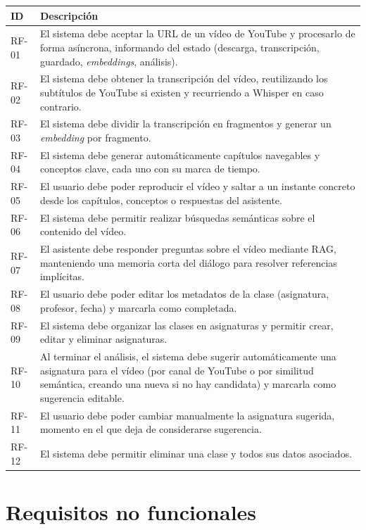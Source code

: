 \begin{longtable}{p{2cm}p{11.5cm}}
  \toprule
  \textbf{ID} & \textbf{Descripción} \\
  \midrule
  \endhead
  RF-01 & El sistema debe aceptar la URL de un vídeo de YouTube y procesarlo de forma asíncrona,
          informando del estado (descarga, transcripción, guardado, \textit{embeddings}, análisis). \\
  RF-02 & El sistema debe obtener la transcripción del vídeo, reutilizando los subtítulos de
          YouTube si existen y recurriendo a Whisper en caso contrario. \\
  RF-03 & El sistema debe dividir la transcripción en fragmentos y generar un \textit{embedding}
          por fragmento. \\
  RF-04 & El sistema debe generar automáticamente capítulos navegables y conceptos clave, cada
          uno con su marca de tiempo. \\
  RF-05 & El usuario debe poder reproducir el vídeo y saltar a un instante concreto desde los
          capítulos, conceptos o respuestas del asistente. \\
  RF-06 & El sistema debe permitir realizar búsquedas semánticas sobre el contenido del vídeo. \\
  RF-07 & El asistente debe responder preguntas sobre el vídeo mediante RAG, manteniendo una
          memoria corta del diálogo para resolver referencias implícitas. \\
  RF-08 & El usuario debe poder editar los metadatos de la clase (asignatura, profesor, fecha) y
          marcarla como completada. \\
  RF-09 & El sistema debe organizar las clases en asignaturas y permitir crear, editar y eliminar
          asignaturas. \\
  RF-10 & Al terminar el análisis, el sistema debe sugerir automáticamente una asignatura para el
          vídeo (por canal de YouTube o por similitud semántica, creando una nueva si no hay
          candidata) y marcarla como sugerencia editable. \\
  RF-11 & El usuario debe poder cambiar manualmente la asignatura sugerida, momento en el que deja
          de considerarse sugerencia. \\
  RF-12 & El sistema debe permitir eliminar una clase y todos sus datos asociados. \\
  \bottomrule
\end{longtable}

\section{Requisitos no funcionales}

